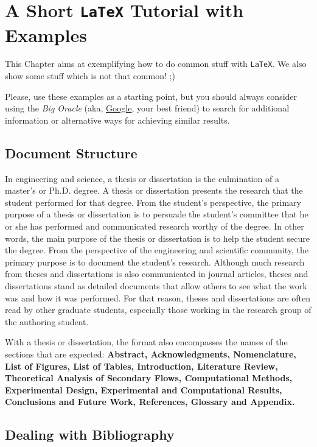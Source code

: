 \chapter{A Short \texttt{LaTeX} Tutorial with Examples}
\label{cha:a_short_latex_tutorial_with_examples}

This Chapter aims at exemplifying how to do common stuff with \texttt{LaTeX}. We also show some stuff which is not that common! ;) 

Please, use these examples as a starting point, but you should always consider using the \emph{Big Oracle} (aka, \href{http://www.google.com}{Google}, your best friend) to search for additional information or alternative ways for achieving similar results.


\section{Document Structure} %
\label{sec:document_structure}

In engineering and science, a thesis or dissertation is the culmination of a master's or Ph.D. degree. A thesis or dissertation presents the research that the student performed for that degree. From the student's perspective, the primary purpose of a thesis or dissertation is to persuade the student's committee that he or she has performed and communicated research worthy of the degree. In other words, the main purpose of the thesis or dissertation is to help the student secure the degree. From the perspective of the engineering and scientific community, the primary purpose is to document the student's research. Although much research from theses and dissertations is also communicated in journal articles, theses and dissertations stand as detailed documents that allow others to see what the work was and how it was performed. For that reason, theses and dissertations are often read by other graduate students, especially those working in the research group of the authoring student. 
	
With a thesis or dissertation, the format also encompasses the names of the sections that are expected: \textbf{Abstract, Acknowledgments, Nomenclature, List of Figures, List of Tables, Introduction, Literature Review, Theoretical Analysis of Secondary Flows, Computational Methods, Experimental Design, Experimental and Computational Results, Conclusions and Future Work, References, Glossary and Appendix.}	


\section{Dealing with Bibliography} %
\label{sec:dealing_with_bibliography}

